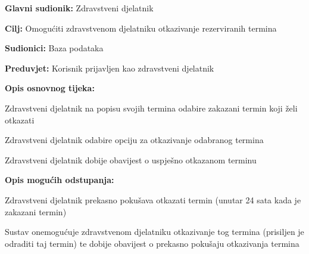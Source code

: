 \noindent {}
\begin{packed_item}
	
	\item \textbf{Glavni sudionik: }Zdravstveni djelatnik
	\item  \textbf{Cilj:} Omogućiti zdravstvenom djelatniku otkazivanje rezerviranih termina
	\item  \textbf{Sudionici:} Baza podataka
	\item  \textbf{Preduvjet:} Korisnik prijavljen kao zdravstveni djelatnik
	\item  \textbf{Opis osnovnog tijeka:}
	
	\item[] \begin{packed_enum}
		
		\item Zdravstveni djelatnik na popisu svojih termina odabire zakazani termin koji želi otkazati
		\item Zdravstveni djelatnik odabire opciju za otkazivanje odabranog termina
		\item Zdravstveni djelatnik dobije obavijest o uspješno otkazanom terminu
	\end{packed_enum}
	
	\item  \textbf{Opis mogućih odstupanja:}
	
	\item[] \begin{packed_item}
		
		\item[2.a] Zdravstveni djelatnik prekasno pokušava otkazati termin (unutar 24 sata kada je zakazani termin)
		\item[] \begin{packed_enum}
			
			\item Sustav onemogućuje zdravstvenom djelatniku otkazivanje tog termina (prisiljen je odraditi taj termin) te dobije obavijest o prekasno pokušaju otkazivanja termina
			
		\end{packed_enum}
		
	\end{packed_item}
	
\end{packed_item}


